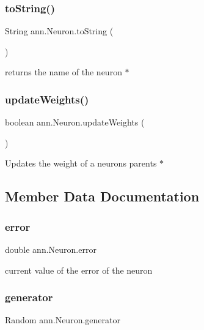 \subsubsection{\texorpdfstring{to\+String()}{toString()}}
{\footnotesize\ttfamily String ann.\+Neuron.\+to\+String (\begin{DoxyParamCaption}{ }\end{DoxyParamCaption})}

returns the name of the neuron $\ast$ \mbox{\label{classann_1_1_neuron_abad6257063d27b721ad47e50a5f68e5e}} 
\subsubsection{\texorpdfstring{update\+Weights()}{updateWeights()}}
{\footnotesize\ttfamily boolean ann.\+Neuron.\+update\+Weights (\begin{DoxyParamCaption}{ }\end{DoxyParamCaption})}

Updates the weight of a neuron\textquotesingle{}s parents $\ast$ 

\subsection{Member Data Documentation}
\mbox{\label{classann_1_1_neuron_a68c3c65ea538d533aae8a343b043d921}} 
\subsubsection{\texorpdfstring{error}{error}}
{\footnotesize\ttfamily double ann.\+Neuron.\+error\hspace{0.3cm}{\ttfamily [protected]}}

current value of the error of the neuron \mbox{\label{classann_1_1_neuron_ac7d2bce61156cee5b79e960bf719ee6b}} 
\subsubsection{\texorpdfstring{generator}{generator}}
{\footnotesize\ttfamily Random ann.\+Neuron.\+generator\hspace{0.3cm}{\ttfamily [static]}}

